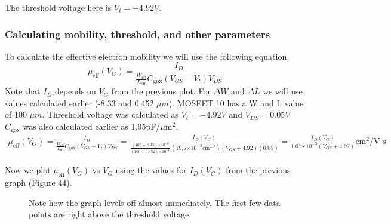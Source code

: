 \documentclass{article}
\providecommand{\e}[1]{\ensuremath{\times 10^{#1}}}
\begin{document}
The threshold voltage here is $V_t = -4.92 V$.

\subsubsection{Calculating mobility, threshold, and other parameters}
To calculate the effective electron mobility we will use the following equation,
\begin{equation}
\mu_{\text{eff}}(V_G) = \frac{I_D}{\frac{W_{\text{eff}}}{L_{\text{eff}}}C_{\text{gox}}(V_{GS} - V_t)V_{DS}}
\end{equation}
Note that $I_D$ depends on $V_{G}$ from the previous plot. For $\Delta W$ and $\Delta L$ we will use values calculated earlier (-8.33 and 0.452 $\mu m$). MOSFET 10 has a W and L value of 100 $\mu m$. Threshold voltage was calculated as $V_t = -4.92 V$ and $V_{DS} = 0.05 V$. $C_{\text{gox}}$ was also calculated earlier as 1.95pF/${\mu\text{m}}^{2}$.
\begin{align*}
\mu_{\text{eff}}(V_G) = \frac{I_D}{\frac{W_{\text{eff}}}{L_{\text{eff}}}C_{\text{gox}}(V_{GS} - V_t)V_{DS}} = \frac{I_D(V_G)}{\frac{(100 + 8.33)\e{-6}}{(100 - 0.452)\e{-6}}(19.5\e{-3}\text{cm}^{-2})(V_{GS} + 4.92)(0.05)} = \frac{I_D(V_G)}{1.07\e{-3}(V_{GS} + 4.92)}{\text{cm}}^2/\text{V-s}
\end{align*}

Now we plot $\mu_{\text{eff}}(V_G)$ vs $V_G$ using the values for $I_D(V_G)$ from the previous graph (Figure 44).
\begin{figure}[H]
\centering
{}
\caption{Note how the graph levels off almost immediately. The first few data points are right above the threshold voltage.}
\end{figure}
\end{document}
